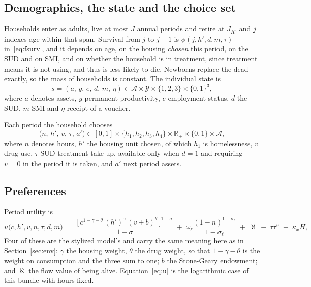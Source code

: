 \documentclass[10pt]{article}
\begin{document}
\subsection{Demographics, the state and the choice set}

Households enter as adults, live at most $J$ annual periods and retire at
$J_R$, and $j$ indexes age within that span. Survival from $j$ to $j+1$ is
$\phi(j,h',d,m,\tau)$ in~\eqref{eq:fsurv}, and it depends on age, on the housing
\emph{chosen} this period, on the SUD and on SMI,
and on whether the household is in treatment, since treatment means it is
not using, and thus is less likely to die. Newborns replace the dead
exactly, so the mass of households is constant. The individual
state is
\begin{equation}\label{eq:fstate}
s=(a,\,y,\,e,\,d,\,m,\,\eta)\in
\mathcal A\times\mathcal Y\times\{1,2,3\}\times\{0,1\}^3 ,
\end{equation}
where $a$ denotes assets, $y$ permanent productivity, $e$ employment status,
$d$ the SUD, $m$ SMI and $\eta$ receipt
of a voucher.

Each period the household chooses
\begin{equation}\label{eq:fchoice}
\big(n,\,h',\,v,\,\tau,\,a'\big)\in
[0,1]\times\{h_1,h_2,h_3,h_4\}\times\mathbb R_+\times\{0,1\}\times\mathcal A ,
\end{equation}
where $n$ denotes hours, $h'$ the housing unit chosen, of which $h_1$ is
homelessness, $v$ drug use, $\tau$ SUD treatment take-up, available only when
$d=1$ and requiring $v=0$ in the period it is taken, and $a'$ next period
assets.

\subsection{Preferences}\label{sec:fprefs}

Period utility is
\begin{equation}\label{eq:futil}
u\big(c,h',v,n,\tau;d,m\big) \;=\;
\frac{\big[\,c^{1-\gamma-\theta}\,(h')^{\gamma}\,(v+b)^{\theta}\,\big]^{1-\sigma}}{1-\sigma}
\;+\;\omega_{\ell}\frac{(1-n)^{1-\sigma_{\ell}}}{1-\sigma_{\ell}}
\;+\;\aleph\;-\;\tau\bar\tau^{u}\;-\;\kappa_x H,
\end{equation}
Four of these are the stylized model's and carry the same meaning here as
in Section~\ref{sec:env}: $\gamma$ the housing weight, $\theta$ the drug weight,
so that $1-\gamma-\theta$ is the weight on consumption and the three sum to one;
$b$ the Stone-Geary endowment; and $\aleph$ the flow value of being alive.
Equation~\eqref{eq:u} is the logarithmic case of this bundle with hours fixed.
\end{document}
